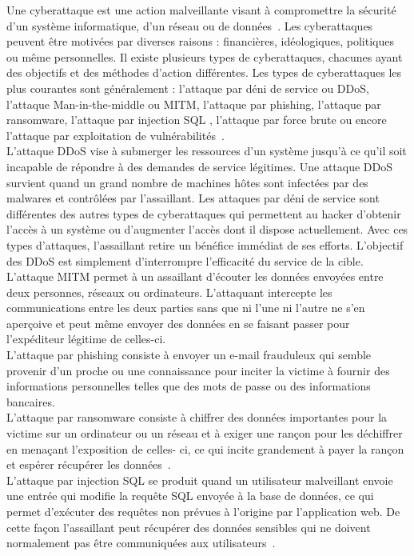 \documentclass[a4paper,11pt]{article}
\begin{document}
Une cyberattaque est une action malveillante visant à compromettre la sécurité d'un système informatique, d'un réseau ou de données~\cite{article3,Article10}. Les cyberattaques peuvent être motivées par diverses raisons : f{\null}inancières, idéologiques, politiques ou même personnelles.
Il existe plusieurs types de cyberattaques, chacunes ayant des objectifs et des méthodes d'action dif{\null}férentes.
Les types de cyberattaques les plus courantes sont généralement : l'attaque par déni de service ou DDoS, l'attaque Man-in-the-middle ou MITM, l'attaque par phishing, l'attaque par ransomware, l'attaque par injection SQL , l'attaque par force brute ou encore l'attaque par exploitation de vulnérabilités~\cite{article2}.
\\L'attaque DDoS vise à submerger les ressources d'un système jusqu'à ce qu'il soit incapable de répondre à des demandes de service légitimes. Une attaque DDoS survient quand un grand nombre de machines hôtes sont infectées par des malwares et contrôlées par l'assaillant. Les attaques par déni de service sont dif{\null}férentes des autres types de cyberattaques qui permettent au hacker d'obtenir l'accès à un système ou d'augmenter l'accès dont il dispose actuellement. Avec ces types d'attaques, l'assaillant retire un bénéf{\null}ice immédiat de ses ef{\null}forts. L'objectif des DDoS est simplement d'interrompre l'ef{\null}f{\null}icacité du service de la cible.
\\L'attaque MITM permet à un assaillant d'écouter les données envoyées entre deux personnes, réseaux ou ordinateurs. L'attaquant intercepte les communications entre les deux parties sans que ni l'une ni l'autre ne s'en aperçoive et peut même envoyer des données en se faisant passer pour l'expéditeur légitime de celles-ci.
\\L'attaque par phishing consiste à envoyer un e-mail frauduleux qui semble provenir d'un proche ou une connaissance pour inciter la victime à fournir des informations personnelles telles que des mots de passe ou des informations bancaires.
\\L'attaque par ransomware consiste à chif{\null}frer des données importantes pour la victime sur un ordinateur ou un réseau et à exiger une rançon pour les déchif{\null}frer en menaçant l'exposition de celles- ci, ce qui incite grandement à payer la rançon et espérer récupérer les données~\cite{article9}.
\\L'attaque par injection SQL se produit quand un utilisateur malveillant envoie une entrée qui modif{\null}ie la requête SQL envoyée à la base de données, ce qui permet d'exécuter des requêtes non prévues à l'origine par l'application web. De cette façon l'assaillant peut récupérer des données sensibles qui ne doivent normalement pas être communiquées aux utilisateurs~\cite{article7}. 
\end{document}

